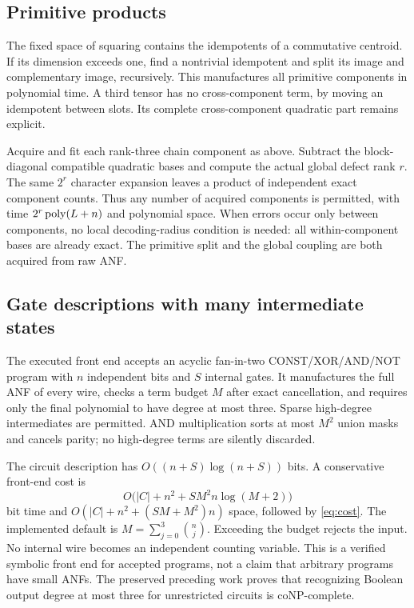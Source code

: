 \documentclass[11pt]{article}
\theoremstyle{remark}\newtheorem{remark}[theorem]{Remark}
\begin{document}
\subsection{Primitive products}
The fixed space of squaring contains the idempotents of a commutative
centroid. If its dimension exceeds one, find a nontrivial idempotent and
split its image and complementary image, recursively. This manufactures
all primitive components in polynomial time. A third tensor has no
cross-component term, by moving an idempotent between slots. Its complete
cross-component quadratic part remains explicit.

Acquire and fit each rank-three chain component as above. Subtract the
block-diagonal compatible quadratic bases and compute the actual global
defect rank $r$. The same $2^r$ character expansion leaves a product of
independent exact component counts. Thus any number of acquired components
is permitted, with time $2^r\operatorname{poly}(L+n)$ and polynomial space.
When errors occur only between components, no local decoding-radius
condition is needed: all within-component bases are already exact.
The primitive split and the global coupling are both acquired from raw ANF.

\subsection{Gate descriptions with many intermediate states}
The executed front end accepts an acyclic fan-in-two CONST/XOR/AND/NOT
program with $n$ independent bits and $S$ internal gates. It manufactures
the full ANF of every wire, checks a term budget $M$ after exact
cancellation, and requires only the final polynomial to have degree at
most three. Sparse high-degree intermediates are permitted.
AND multiplication sorts at most $M^2$ union masks and cancels parity;
no high-degree terms are silently discarded.

The circuit description has $O((n+S)\log(n+S))$ bits. A conservative
front-end cost is
\[
 O\bigl(|C|+n^2+SM^2n\log(M+2)\bigr)
\]
bit time and $O(|C|+n^2+(SM+M^2)n)$ space, followed by
\eqref{eq:cost}. The implemented default is
$M=\sum_{j=0}^3\binom nj$. Exceeding the budget rejects the input.
No internal wire becomes an independent counting variable. This is a
verified symbolic front end for accepted programs, not a claim that
arbitrary programs have small ANFs. The preserved preceding work proves
that recognizing Boolean output degree at most three for unrestricted
circuits is coNP-complete.
\end{document}

